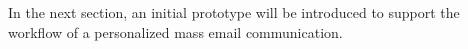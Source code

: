 \vspace{1cm}

In the next section, an initial prototype will be introduced to support the workflow of a personalized mass email communication.

